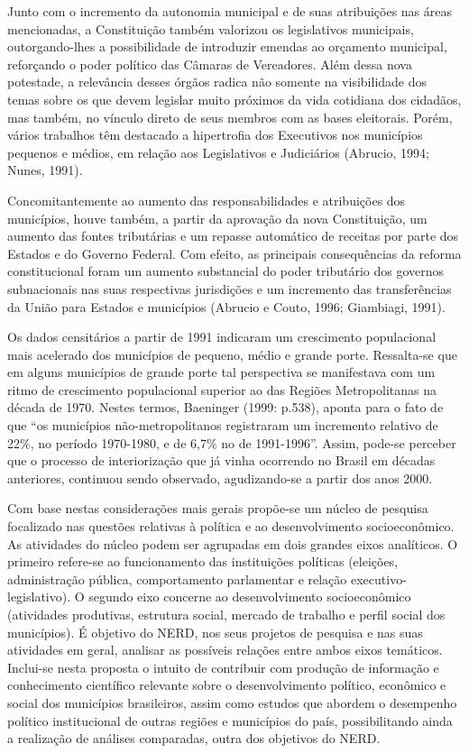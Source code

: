 \documentclass[
  12pt,
]{article}
\begin{document}
Junto com o incremento da autonomia municipal e de suas atribuições nas
áreas mencionadas, a Constituição também valorizou os legislativos
municipais, outorgando-lhes a possibilidade de introduzir emendas ao
orçamento municipal, reforçando o poder político das Câmaras de
Vereadores. Além dessa nova potestade, a relevância desses órgãos radica
não somente na visibilidade dos temas sobre os que devem legislar muito
próximos da vida cotidiana dos cidadãos, mas também, no vínculo direto
de seus membros com as bases eleitorais. Porém, vários trabalhos têm
destacado a hipertrofia dos Executivos nos municípios pequenos e médios,
em relação aos Legislativos e Judiciários (Abrucio, 1994; Nunes, 1991).

Concomitantemente ao aumento das responsabilidades e atribuições dos
municípios, houve também, a partir da aprovação da nova Constituição, um
aumento das fontes tributárias e um repasse automático de receitas por
parte dos Estados e do Governo Federal. Com efeito, as principais
consequências da reforma constitucional foram um aumento substancial do
poder tributário dos governos subnacionais nas suas respectivas
jurisdições e um incremento das transferências da União para Estados e
municípios (Abrucio e Couto, 1996; Giambiagi, 1991).

Os dados censitários a partir de 1991 indicaram um crescimento
populacional mais acelerado dos municípios de pequeno, médio e grande
porte. Ressalta-se que em alguns municípios de grande porte tal
perspectiva se manifestava com um ritmo de crescimento populacional
superior ao das Regiões Metropolitanas na década de 1970. Nestes termos,
Baeninger (1999: p.538), aponta para o fato de que ``os municípios
não-metropolitanos registraram um incremento relativo de 22\%, no
período 1970-1980, e de 6,7\% no de 1991-1996''. Assim, pode-se perceber
que o processo de interiorização que já vinha ocorrendo no Brasil em
décadas anteriores, continuou sendo observado, agudizando-se a partir
dos anos 2000.

Com base nestas considerações mais gerais propõe-se um núcleo de
pesquisa focalizado nas questões relativas à política e ao
desenvolvimento socioeconômico. As atividades do núcleo podem ser
agrupadas em dois grandes eixos analíticos. O primeiro refere-se ao
funcionamento das instituições políticas (eleições, administração
pública, comportamento parlamentar e relação executivo-legislativo). O
segundo eixo concerne ao desenvolvimento socioeconômico (atividades
produtivas, estrutura social, mercado de trabalho e perfil social dos
municípios). É objetivo do NERD, nos seus projetos de pesquisa e nas
suas atividades em geral, analisar as possíveis relações entre ambos
eixos temáticos. Inclui-se nesta proposta o intuito de contribuir com
produção de informação e conhecimento científico relevante sobre o
desenvolvimento político, econômico e social dos municípios brasileiros,
assim como estudos que abordem o desempenho político institucional de
outras regiões e municípios do país, possibilitando ainda a realização
de análises comparadas, outra dos objetivos do NERD.
\end{document}
